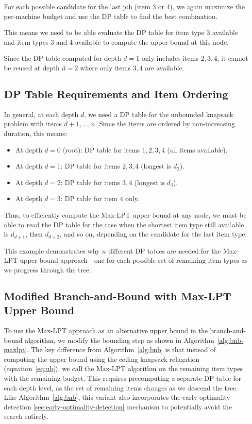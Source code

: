 For each possible candidate for the last job (item $3$ or $4$), we again maximize the per-machine budget and use the DP table to find the best combination.

This means we need to be able evaluate the DP table for item type $3$ available and item types $3$ and $4$ available to compute the upper bound at this node.

Since the DP table computed for depth $d=1$ only includes items $2,3,4$, it cannot be reused at depth $d=2$ where only items $3,4$ are available.

\subsection*{DP Table Requirements and Item Ordering}

In general, at each depth $d$, we need a DP table for the unbounded knapsack problem with items $d+1, \ldots, n$. Since the items are ordered by non-increasing duration, this means:

\begin{itemize}
    \item At depth $d = 0$ (root): DP table for items $1,2,3,4$ (all items available).
    \item At depth $d = 1$: DP table for items $2,3,4$ (longest is $d_2$).
    \item At depth $d = 2$: DP table for items $3,4$ (longest is $d_3$).
    \item At depth $d = 3$: DP table for item $4$ only.
\end{itemize}

Thus, to efficiently compute the Max-LPT upper bound at any node, 
we must be able to read the DP table for the case when the shortest item type still available is $d_{d+1}$, then $d_{d+2}$, and so on, depending on the candidate for the last item type.

\medskip

This example demonstrates why $n$ different DP tables are needed for the Max-LPT upper bound approach—one for each possible set of remaining item types as we progress through the tree.

\subsection{Modified Branch-and-Bound with Max-LPT Upper Bound}

To use the Max-LPT approach as an alternative upper bound in the branch-and-bound algorithm, we modify the bounding step as shown in Algorithm~\ref{alg:bnb-maxlpt}. 
The key difference from Algorithm~\ref{alg:bnb} is that instead of computing the upper bound using the ceiling knapsack relaxation (equation~\eqref{eq:ub}), 
we call the Max-LPT algorithm on the remaining item types with the remaining budget. 
This requires precomputing a separate DP table for each depth level, as the set of remaining items changes as we descend the tree. 
Like Algorithm~\ref{alg:bnb}, this variant also incorporates the early optimality detection \ref{sec:early-optimality-detection} mechanism to potentially avoid the search entirely.

